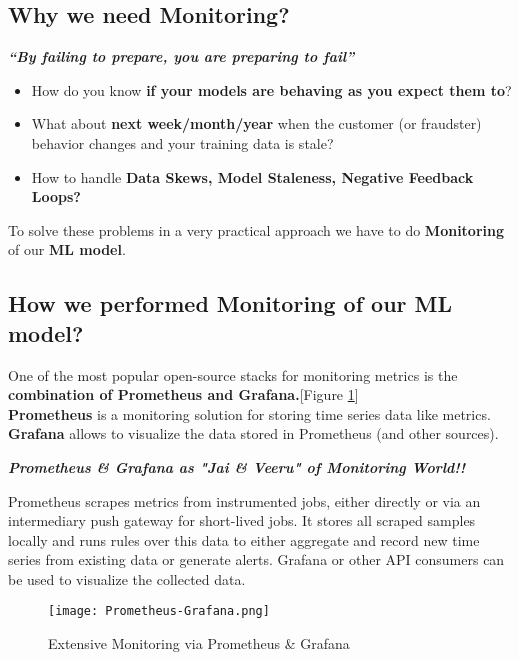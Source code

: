 \documentclass[12pt,oneside,a4paper]{report}
\begin{document}
\subsection{Why we need Monitoring?}
\fontsize{12pt}{10pt}\selectfont
\begin{center}
\textbf{\textit{\large{“By failing to prepare, you are preparing to fail”\\}}}
\end{center}
\begin{itemize}
\item How do you know \textbf{if your models are behaving as you expect them to}? 
\item What about \textbf{next week/month/year} when the customer (or fraudster) behavior changes and your training data is stale?
\item How to handle \textbf{Data Skews, Model Staleness, Negative Feedback Loops?}
\end{itemize}
To solve these problems in a very practical approach we have to do \textbf{Monitoring} of our \textbf{ML model}.

\subsection{How we performed Monitoring of our ML model?}
\fontsize{12pt}{10pt}\selectfont
One of the most popular open-source stacks for monitoring metrics is the \textbf{combination of Prometheus and Grafana.}[Figure \ref{fig_MonitoringCycle}]\\
\textbf{Prometheus} is a monitoring solution for storing time series data like metrics. \textbf{Grafana} allows to visualize the data stored in Prometheus (and other sources).\\ 
\newpage
\begin{center}
\textbf{\textit{\Large{Prometheus \& Grafana as "Jai \& Veeru" of Monitoring World!!}}}
\end{center}
Prometheus scrapes metrics from instrumented jobs, either directly or via an intermediary push gateway for short-lived jobs. It stores all scraped samples locally and runs rules over this data to either aggregate and record new time series from existing data or generate alerts. Grafana or other API consumers can be used to visualize the collected data.

\begin{figure}[h]
\centering
\texttt{[image: Prometheus-Grafana.png]}
\caption{Extensive Monitoring via Prometheus \& Grafana}
\label{fig_MonitoringCycle}
\end{figure}
\end{document}
